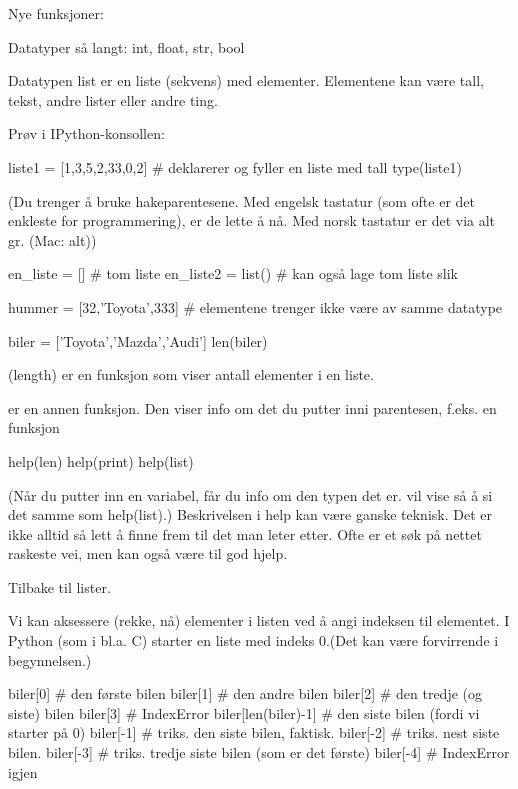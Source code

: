 {\begin{usnintro}
Nye funksjoner: 
\end{usnintro}

Datatyper så langt: int, float, str, bool

Datatypen list er en liste (sekvens) med elementer. Elementene kan være tall, tekst, andre lister eller andre ting.

Prøv i IPython-konsollen:

\begin{usncodebox}
liste1 = [1,3,5,2,33,0,2]  # deklarerer og fyller en liste med tall
type(liste1)
\end{usncodebox}

(Du trenger å bruke hakeparentesene. Med engelsk tastatur (som ofte er det enkleste for programmering), er de lette å nå. Med norsk tastatur er det via alt gr. (Mac: alt))

\begin{usncodebox}
en_liste = []        # tom liste
en_liste2 = list()   # kan også lage tom liste slik

hummer = [32,'Toyota',333]   # elementene trenger ikke være av samme datatype

biler = ['Toyota','Mazda','Audi'] 
len(biler) 
\end{usncodebox}

 (length) er en funksjon som viser antall elementer i en liste. 

 er en annen funksjon. Den viser info om det du putter inni parentesen, f.eks. en funksjon

\begin{usncodebox}
help(len)
help(print)
help(list)
\end{usncodebox}

(Når du putter inn en variabel, får du info om den typen det er. 
 vil vise så å si det samme som help(list).) Beskrivelsen i help kan være ganske teknisk. Det er ikke alltid så lett å finne frem til det man leter etter. Ofte er et søk på nettet raskeste vei, men  kan også være til god hjelp. 

Tilbake til lister.

Vi kan aksessere (rekke, nå) elementer i listen ved å angi indeksen til elementet. I Python (som i bl.a. C) starter en liste med indeks 0.(Det kan være forvirrende i begynnelsen.) 

\begin{usncodebox}
biler[0]       # den første bilen 
biler[1]       # den andre bilen
biler[2]       # den tredje (og siste) bilen
biler[3]       # IndexError
biler[len(biler)-1]   # den siste bilen (fordi vi starter på 0) 
biler[-1]      # triks. den siste bilen, faktisk. 
biler[-2]      # triks. nest siste bilen. 
biler[-3]      # triks. tredje siste bilen (som er det første)
biler[-4]      # IndexError igjen
\end{usncodebox}

}
